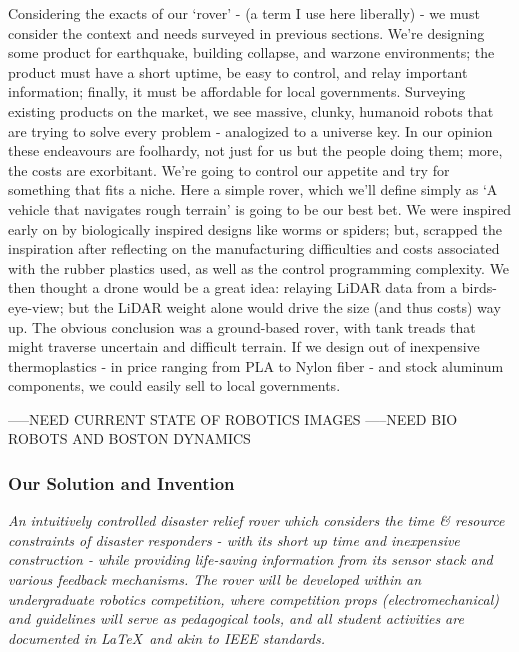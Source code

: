 \documentclass[a4paper, 10pt]{article}
\begin{document}
		Considering the exacts of our `rover' - (a term I use here liberally) - we must consider the context and needs surveyed in previous sections. We're designing some product for earthquake, building collapse, and warzone environments; the product must have a short uptime, be easy to control, and relay important information; finally, it must be affordable for local governments. Surveying existing products on the market, we see massive, clunky, humanoid robots that are trying to solve every problem - analogized to a universe key. In our opinion these endeavours are foolhardy, not just for us but the people doing them; more, the costs are exorbitant. We're going to control our appetite and try for something that fits a niche. Here a simple rover, which we'll define simply as `A vehicle that navigates rough terrain' is going to be our best bet. We were inspired early on by biologically inspired designs like worms or spiders; but, scrapped the inspiration after reflecting on the manufacturing difficulties and costs associated with the rubber plastics used, as well as the control programming complexity. We then thought a drone would be a great idea: relaying LiDAR data from a birds-eye-view; but the LiDAR weight alone would drive the size (and thus costs) way up. The obvious conclusion was a ground-based rover, with tank treads that might traverse uncertain and difficult terrain. If we design out of inexpensive thermoplastics - in price ranging from PLA to Nylon fiber - and stock aluminum components, we could easily sell to local governments.
		
		
		-----NEED CURRENT STATE OF ROBOTICS IMAGES
		-----NEED BIO ROBOTS AND BOSTON DYNAMICS

		\subsubsection*{Our Solution and Invention}
		\textit{An intuitively controlled disaster relief rover which considers the time \& resource constraints of disaster responders - with its short up time and inexpensive construction - while providing life-saving information from its sensor stack and various feedback mechanisms. The rover will be developed within an undergraduate robotics competition, where competition props (electromechanical) and guidelines will serve as pedagogical tools, and all student activities are documented in \LaTeX\ and akin to IEEE standards.}		
		
\end{document}
